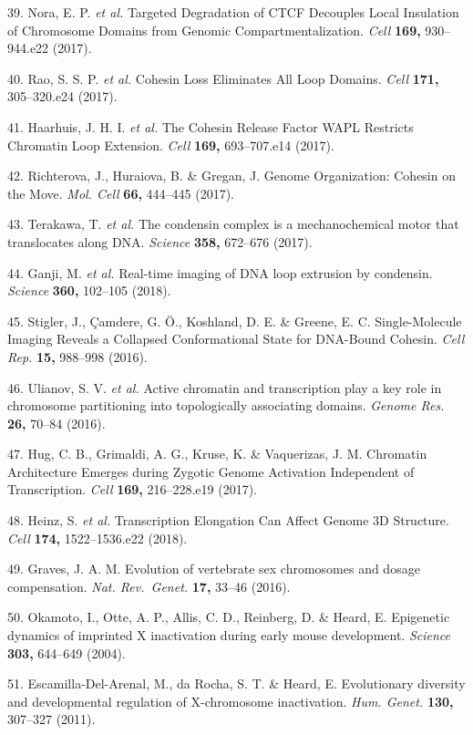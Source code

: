 \documentclass[11pt,twoside]{MPIthesis}
\theoremstyle{definition}
\theoremstyle{definition}
\theoremstyle{definition}
\theoremstyle{remark}
\begin{document}
39. Nora, E. P. \emph{et al.} Targeted Degradation of CTCF Decouples
Local Insulation of Chromosome Domains from Genomic
Compartmentalization. \emph{Cell} \textbf{169,} 930--944.e22 (2017).

40. Rao, S. S. P. \emph{et al.} Cohesin Loss Eliminates All Loop
Domains. \emph{Cell} \textbf{171,} 305--320.e24 (2017).

41. Haarhuis, J. H. I. \emph{et al.} The Cohesin Release Factor WAPL
Restricts Chromatin Loop Extension. \emph{Cell} \textbf{169,}
693--707.e14 (2017).

42. Richterova, J., Huraiova, B. \& Gregan, J. Genome Organization:
Cohesin on the Move. \emph{Mol. Cell} \textbf{66,} 444--445 (2017).

43. Terakawa, T. \emph{et al.} The condensin complex is a
mechanochemical motor that translocates along DNA. \emph{Science}
\textbf{358,} 672--676 (2017).

44. Ganji, M. \emph{et al.} Real-time imaging of DNA loop extrusion by
condensin. \emph{Science} \textbf{360,} 102--105 (2018).

45. Stigler, J., Çamdere, G. Ö., Koshland, D. E. \& Greene, E. C.
Single-Molecule Imaging Reveals a Collapsed Conformational State for
DNA-Bound Cohesin. \emph{Cell Rep.} \textbf{15,} 988--998 (2016).

46. Ulianov, S. V. \emph{et al.} Active chromatin and transcription play
a key role in chromosome partitioning into topologically associating
domains. \emph{Genome Res.} \textbf{26,} 70--84 (2016).

47. Hug, C. B., Grimaldi, A. G., Kruse, K. \& Vaquerizas, J. M.
Chromatin Architecture Emerges during Zygotic Genome Activation
Independent of Transcription. \emph{Cell} \textbf{169,} 216--228.e19
(2017).

48. Heinz, S. \emph{et al.} Transcription Elongation Can Affect Genome
3D Structure. \emph{Cell} \textbf{174,} 1522--1536.e22 (2018).

49. Graves, J. A. M. Evolution of vertebrate sex chromosomes and dosage
compensation. \emph{Nat. Rev.~Genet.} \textbf{17,} 33--46 (2016).

50. Okamoto, I., Otte, A. P., Allis, C. D., Reinberg, D. \& Heard, E.
Epigenetic dynamics of imprinted X inactivation during early mouse
development. \emph{Science} \textbf{303,} 644--649 (2004).

51. Escamilla-Del-Arenal, M., da Rocha, S. T. \& Heard, E. Evolutionary
diversity and developmental regulation of X-chromosome inactivation.
\emph{Hum. Genet.} \textbf{130,} 307--327 (2011).
\end{document}
